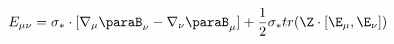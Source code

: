 \begin{equation}
\label{e5:45}
E_{\mu \nu}=\sigma_{\ast} \cdot [\nabla_{\mu}\paraB_{\nu}-\nabla_{\nu}\paraB_{\mu}]+\frac{1}{2} \sigma_{\ast} tr(\Z \cdot [\E_{\mu},\E_{\nu}])
\end{equation}


